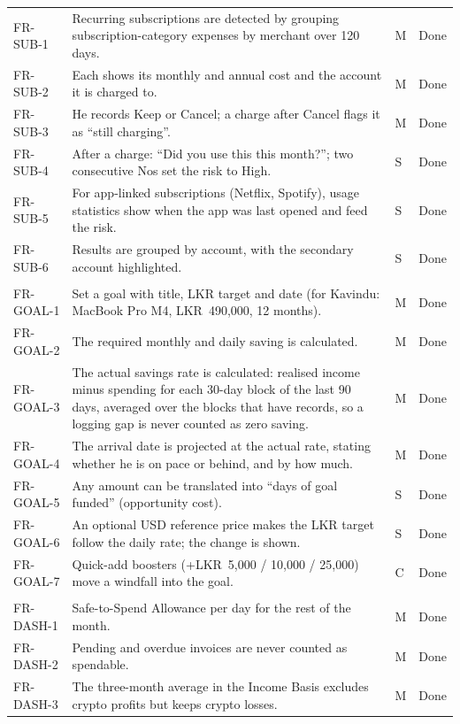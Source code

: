 \documentclass[11pt,a4paper]{article}
\newcommand{\lkr}[1]{LKR~#1}
\begin{document}
\begin{longtable}{|>{\raggedright\arraybackslash}p{2.2cm}|>{\raggedright\arraybackslash}p{9.5cm}|C{0.7cm}|>{\raggedright\arraybackslash}p{1.6cm}|}
FR-SUB-1 & Recurring subscriptions are detected by grouping subscription-category expenses by merchant over 120 days. & M & Done\\
FR-SUB-2 & Each shows its monthly and annual cost and the account it is charged to. & M & Done\\
FR-SUB-3 & He records Keep or Cancel; a charge after Cancel flags it as ``still charging''. & M & Done\\
FR-SUB-4 & After a charge: ``Did you use this this month?''; two consecutive Nos set the risk to High. & S & Done\\
FR-SUB-5 & For app-linked subscriptions (Netflix, Spotify), usage statistics show when the app was last opened and feed the risk. & S & Done\\
FR-SUB-6 & Results are grouped by account, with the secondary account highlighted. & S & Done\\
\\
FR-GOAL-1 & Set a goal with title, LKR target and date (for Kavindu: MacBook Pro M4, \lkr{490,000}, 12 months). & M & Done\\
FR-GOAL-2 & The required monthly and daily saving is calculated. & M & Done\\
FR-GOAL-3 & The actual savings rate is calculated: realised income minus spending for each 30-day block of the last 90 days, averaged over the blocks that have records, so a logging gap is never counted as zero saving. & M & Done\\
FR-GOAL-4 & The arrival date is projected at the actual rate, stating whether he is on pace or behind, and by how much. & M & Done\\
FR-GOAL-5 & Any amount can be translated into ``days of goal funded'' (opportunity cost). & S & Done\\
FR-GOAL-6 & An optional USD reference price makes the LKR target follow the daily rate; the change is shown. & S & Done\\
FR-GOAL-7 & Quick-add boosters (+\lkr{5,000} / 10,000 / 25,000) move a windfall into the goal. & C & Done\\
\\
FR-DASH-1 & Safe-to-Spend Allowance per day for the rest of the month. & M & Done\\
FR-DASH-2 & Pending and overdue invoices are never counted as spendable. & M & Done\\
FR-DASH-3 & The three-month average in the Income Basis excludes crypto profits but keeps crypto losses. & M & Done\\

\end{longtable}
\end{document}
